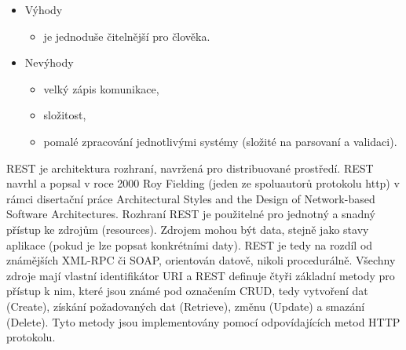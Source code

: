 \begin{itemize}
	\setlength{\parskip}{0pt}
	\setlength{\itemsep}{0pt}
	\item {Výhody}
	\begin{itemize}
		\setlength{\parskip}{0pt}
		\setlength{\itemsep}{0pt}
		\item {je jednoduše čitelnější pro člověka.}
	\end{itemize}	
	
	\item {Nevýhody}
	\begin{itemize}
		\setlength{\parskip}{0pt}
		\setlength{\itemsep}{0pt}
		\item {velký zápis komunikace,}
		\item {složitost,}
		\item {pomalé zpracování jednotlivými systémy (složité na parsovaní a validaci).}
	\end{itemize}
\end{itemize}

REST je architektura rozhraní, navržená pro distribuované prostředí. REST navrhl a popsal v roce 2000 Roy Fielding (jeden ze spoluautorů protokolu http) v rámci disertační práce Architectural Styles and the Design of Network-based Software Architectures. Rozhraní REST je použitelné pro jednotný a snadný přístup ke zdrojům (resources). Zdrojem mohou být data, stejně jako stavy aplikace (pokud je lze popsat konkrétními daty). REST je tedy na rozdíl od známějších XML-RPC či SOAP, orientován datově, nikoli procedurálně. Všechny zdroje mají vlastní identifikátor URI a REST definuje čtyři základní metody pro přístup k nim, které jsou známé pod označením CRUD, tedy vytvoření dat (Create), získání požadovaných dat (Retrieve), změnu (Update) a smazání (Delete). Tyto metody jsou implementovány pomocí
odpovídajících metod HTTP protokolu.

